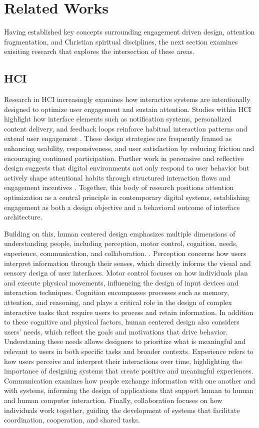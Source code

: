 \documentclass[12pt]{article}
\begin{document}
\section{Related Works}

Having established key concepts surrounding engagement driven design, attention fragmentation, and Christian spiritual disciplines, the next section examines exisiting research that explores the intersection of these areas.

\subsection{HCI}
Research in HCI increasingly examines how interactive systems are intentionally designed to optimize user engagement and sustain attention. Studies within HCI highlight how interface elements such as notification systems, personalized content delivery, and feedback loops reinforce habitual interaction patterns and extend user engagement \cite{10.1145/3538706,10.1145/3491101.3519856}. These design strategies are frequently framed as enhancing usability, responsiveness, and user satisfaction by reducing friction and encouraging continued participation. Further work in persuasive and reflective design suggests that digital environments not only respond to user behavior but actively shape attentional habits through structured interaction flows and engagement incentives \cite{10.1145/3542838}. Together, this body of research positions attention optimization as a central principle in contemporary digital systems, establishing engagement as both a design objective and a behavioral outcome of interface architecture. 

Building on this, human centered design emphasizes multiple dimensions of understanding people, including perception, motor control, cognition, needs, experience, communication, and collaboration. \cite{Hornbæk_Kristensson_Oulasvirta_2025}. Perception concerns how users interpret information through their senses, which directly informs the visual and sensory design of user interfaces. Motor control focuses on how individuals plan and execute physical movements, influencing the design of input devices and interaction techniques. Cognition encompasses processes such as memory, attention, and reasoning, and plays a critical role in the design of complex interactive tasks that require users to process and retain information. In addition to these cognitive and physical factors, human centered design also considers users' needs, which reflect the goals and motivations that drive behavior. Understaning these needs allows designers to prioritize what is meaningful and relevant to users in both specific tasks and broader contexts. Experience refers to how users perceive and interpret their interactions over time, highlighting the importance of designing systems that create positive and meaningful experiences. Communication examines how people exchange information with one another and with systems, informing the design of applications that support human to human and human computer interaction. Finally, collaboration focuses on how individuals work together, guiding the development of systems that facilitate coordination, cooperation, and shared tasks. 
\end{document}
